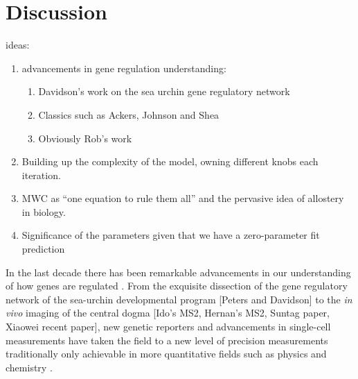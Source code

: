 \pagebreak
\section*{Discussion }



ideas:
\begin{enumerate}
  \item advancements in gene regulation understanding:
    \begin{enumerate}
      \item Davidson's work on the sea urchin gene regulatory network
      \item Classics such as Ackers, Johnson and Shea
      \item Obviously Rob's work
    \end{enumerate}
  \item Building up the complexity of the model, owning different knobs each
  iteration.
  \item MWC as ``one equation to rule them all'' and the pervasive idea of
  allostery in biology.
  \item Significance of the parameters given that we have a zero-parameter fit
  prediction
\end{enumerate}

In the last decade there has been remarkable advancements in our understanding
of how genes are regulated . From the exquisite dissection of the gene regulatory
network of the sea-urchin developmental program [Peters and Davidson] to the
\textit{in vivo} imaging of the central dogma [Ido's MS2, Hernan's MS2, Suntag
paper, Xiaowei recent paper], new genetic reporters and  advancements in
single-cell measurements have taken the field to a new level of precision
measurements traditionally only achievable in more quantitative fields such as
physics and chemistry .

